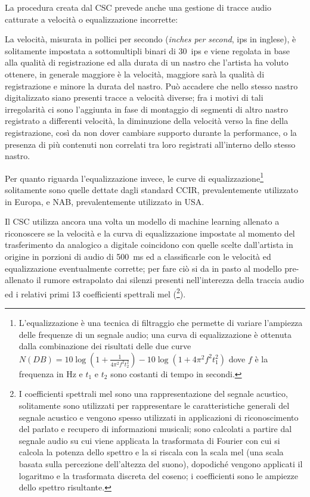 La procedura creata dal \ac{CSC} prevede anche una gestione di tracce audio catturate a velocità o equalizzazione incorrette:

La velocità, misurata in pollici per secondo (\textit{inches per second}, ips in inglese), è solitamente impostata a sottomultipli binari di \qty{30}{ips} e viene regolata in base alla qualità di registrazione ed alla durata di un nastro che l'artista ha voluto ottenere, in generale maggiore è la velocità, maggiore sarà la qualità di registrazione e minore la durata del nastro.
Può accadere che nello stesso nastro digitalizzato siano presenti tracce a velocità diverse; fra i motivi di tali irregolarità ci sono l'aggiunta in fase di montaggio di segmenti di altro nastro registrato a differenti velocità, la diminuzione della velocità verso la fine della registrazione, così da non dover cambiare supporto durante la performance, o la presenza di più contenuti non correlati tra loro registrati all'interno dello stesso nastro.

Per quanto riguarda l'equalizzazione invece, le curve di equalizzazione\footnote{L'equalizzazione è una tecnica di filtraggio che permette di variare l'ampiezza delle frequenze di un segnale audio; una curva di equalizzazione è ottenuta dalla combinazione dei risultati delle due curve $N(DB)=10 \log(1 + \frac{1}{4 \pi^2 f^2 t_2^2}) - 10 \log(1+4\pi^2 f^2 t_1^2)$ dove $f$ è la frequenza in \unit{\Hz} e $t_1$ e $t_2$ sono costanti di tempo in secondi.} solitamente sono quelle dettate dagli standard \acs{CCIR}, prevalentemente utilizzato in Europa, e \acs{NAB}, prevalentemente utilizzato in USA.

Il CSC utilizza ancora una volta un modello di machine learning allenato a riconoscere se la velocità e la curva di equalizzazione impostate al momento del trasferimento da analogico a digitale coincidono con quelle scelte dall'artista in origine in porzioni di audio di \qty{500}{\ms} ed a classificarle con le velocità ed equalizzazione eventualmente corrette; per fare ciò si da in pasto al modello pre-allenato il rumore estrapolato dai silenzi presenti nell'interezza della traccia audio ed i relativi primi 13 coefficienti spettrali mel (\footnote{I coefficienti spettrali mel sono una rappresentazione del segnale acustico, solitamente sono utilizzati per rappresentare le caratteristiche generali del segnale acustico e vengono spesso utilizzati in applicazioni di riconoscimento del parlato e recupero di informazioni musicali; sono calcolati a partire dal segnale audio su cui viene applicata la trasformata di Fourier con cui si calcola la potenza dello spettro e la si riscala con la scala mel (una scala basata sulla percezione dell'altezza del suono), dopodiché vengono applicati il logaritmo e la trasformata discreta del coseno; i coefficienti sono le ampiezze dello spettro risultante.}).
